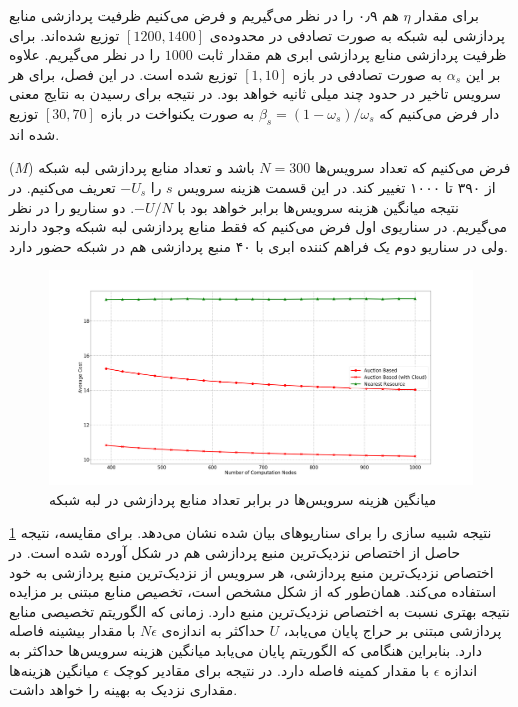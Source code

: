     برای مقدار $\eta$ هم ۰٫۹ را در نظر می‌گیریم و فرض می‌کنیم ظرفیت پردازشی منابع پردازشی لبه شبکه به صورت تصادفی در محدوده‌ی $[1200, 1400]$ توزیع شده‌اند.
    برای ظرفیت پردازشی منابع پردازشی ابری هم مقدار ثابت $1000$ را در نظر می‌گیریم.
    علاوه بر این $\alpha_s$ به صورت تصادفی در بازه $[1, 10]$ توزیع شده است.
    در این فصل، برای هر سرویس تاخیر در حدود چند میلی ثانیه خواهد بود.
    در نتیجه برای رسیدن به نتایج معنی دار فرض می‌کنیم که $\beta_s = (1-\omega_s)/\omega_s$ به صورت یکنواخت در بازه $[30,70]$ توزیع شده اند.
    
    فرض می‌کنیم که تعداد سرویس‌ها $N=300$ باشد و تعداد منابع پردازشی لبه شبکه ($M$) از ۳۹۰ تا ۱۰۰۰ تغییر کند.
    در این قسمت هزینه سرویس $s$ را $-U_s$ تعریف می‌کنیم. 
    در نتیجه میانگین هزینه سرویس‌ها برابر خواهد بود با $-U/N$.
    دو سناریو را در نظر می‌گیریم.
    در سناریو‌ی اول فرض می‌کنیم که فقط منابع پردازشی لبه شبکه وجود دارند ولی در سناریو دوم یک فراهم کننده ابری با ۴۰ منبع پردازشی هم در شبکه حضور دارد.
    
    \begin{figure}
      \centerline{\includegraphics[width=17cm]{graphics/one_to_one/sim_1}}
      \caption{میانگین هزینه سرویس‌ها در برابر تعداد منابع پردازشی در لبه شبکه}
      \label{fig:ono_to_one:sim1}
    \end{figure}

    \cref{fig:ono_to_one:sim1} نتیجه شبیه سازی را برای سناریو‌های بیان شده نشان می‌دهد.
    برای مقایسه، نتیجه حاصل از اختصاص نزدیک‌ترین منبع پردازشی هم در شکل آورده شده است.
    در اختصاص نزدیک‌ترین منبع پردازشی، هر سرویس از نزدیک‌ترین منبع پردازشی به خود استفاده می‌کند.
    همان‌طور که از شکل مشخص است، تخصیص منابع مبتنی بر مزایده نتیجه بهتری نسبت به اختصاص نزدیک‌ترین منبع دارد.
    زمانی که الگوریتم تخصیصی منابع پردازشی مبتنی بر حراج پایان می‌یابد، $U$ حداکثر به اندازه‌ی $N\epsilon$ با مقدار بیشینه فاصله دارد.
    بنابراین هنگامی که الگوریتم پایان می‌یابد میانگین هزینه سرویس‌ها حداکثر به اندازه $\epsilon$ با مقدار کمینه فاصله دارد.
    در نتیجه برای مقادیر کوچک $\epsilon$ میانگین هزینه‌ها مقداری نزدیک به بهینه را خواهد داشت.

